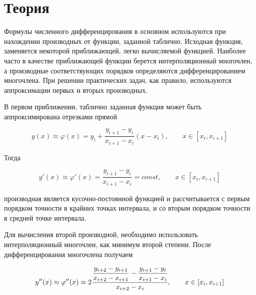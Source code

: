 \section*{Теория}

Формулы численного дифференцирования в основном используются при нахождении
производных от функции, заданной таблично. Исходная функция, заменяется
некоторой приближающей, легко вычисляемой функцией. Наиболее часто в качестве
приближающей функции берется интерполяционный многочлен, а производные
соответствующих порядков определяются дифференцированием многочлена.
При решении практических задач, как правило, используются аппроксимации первых и
вторых производных.

В первом приближении, таблично заданная функция может быть аппроксимирована
отрезками прямой

$$y(x) \approx \varphi(x) = y_i + \frac{y_{i+1} - y_i}{x_{i+1}-x_i}(x-x_i),
\qquad x \in [x_i,x_{i+1}]$$

Тогда

$$y'(x) \approx \varphi'(x) = \frac{y_{i+1} - y_i}{x_{i+1}-x_i} = const,
\qquad x \in [x_i,x_{i+1}]$$

производная является кусочно-постоянной функцией и рассчитывается с первым
порядком точности в крайних точках интервала, и со вторым порядком точности в
средней точке интервала.

Для вычисления второй производной, необходимо использовать интерполяционный
многочлен, как минимум второй степени. После дифференцирования многочлена
получаем

$$y''(x) \approx \varphi''(x) = 2\cfrac
{\dfrac{y_{i+2} - y_{i+1}}{x_{i+2}-x_{i+1}} - \dfrac{y_{i+1} - y_i}{x_{i+1}-x_i}}
{x_{i+2}-x_i}, \qquad x \in [x_i,x_{i+1}]$$
\pagebreak